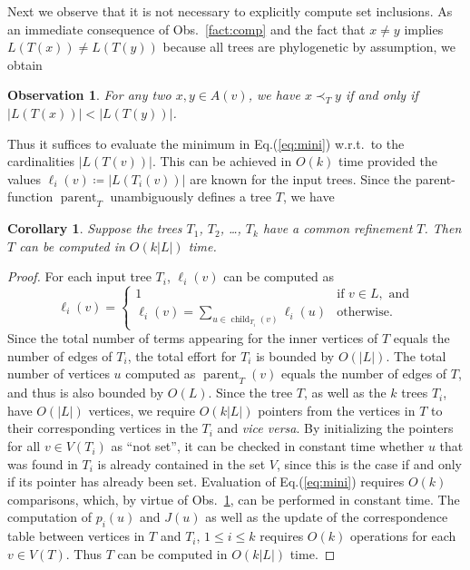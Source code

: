 \documentclass[11pt]{article}
\newtheorem{corollary}[theorem]{Corollary}
\newtheorem{fact}[theorem]{Observation}
\newcommand{\parent}{\operatorname{parent}}
\newcommand{\child}{\operatorname{child}}
\begin{document}
Next we observe that it is not necessary to explicitly compute set
inclusions. As an immediate consequence of Obs.~\ref{fact:comp} and the
fact that $x\ne y$ implies $L(T(x))\ne L(T(y))$ because all trees are
phylogenetic by assumption, we obtain
\begin{fact}
  \label{fact:cardi}
  For any two $x,y\in A(v)$, we have $x\prec_T y$ if and only if
  $|L(T(x))|<|L(T(y))|$. 
\end{fact}
Thus it suffices to evaluate the minimum in Eq.(\ref{eq:mini}) w.r.t.\ to
the cardinalities $|L(T(v))|$. This can be achieved in $O(k)$ time provided
the values $\ell_i(v)\coloneqq |L(T_i(v))|$ are known for the input
trees. Since the parent-function $\parent_T$ unambiguously defines a tree
$T$, we have
\begin{corollary}
  Suppose the trees $T_1$, $T_2$, \dots, $T_k$ have a common refinement
  $T$. Then $T$ can be computed in $O(k|L|)$ time.
  \label{cor:linear-if-T-exists}
\end{corollary}
\begin{proof}
  For each input tree $T_i$, $\ell_i(v)$ can be computed as
  \begin{equation}
    \label{eq:ell-i}
    \ell_i(v)=
    \begin{cases}
      1              & \text{if } v\in L, \text{ and} \\
      \ell_i(v)=\displaystyle\sum_{u\in\child_{T_i}(v)}\ell_i(u) 
      & \text{otherwise.}
    \end{cases}
  \end{equation}
  Since the total number of terms appearing for the inner vertices of $T$
  equals the number of edges of $T_i$, the total effort for $T_i$ is
  bounded by $O(|L|)$. The total number of vertices $u$ computed as
  $\parent_{T}(v)$ equals the number of edges of $T$, and thus is also
  bounded by $O(L)$.  Since the tree $T$, as well as the $k$ trees $T_i$,
  have $O(|L|)$ vertices, we require $O(k|L|)$ pointers from the vertices
  in $T$ to their corresponding vertices in the $T_i$ and \textit{vice
    versa}.  By initializing the pointers for all $v\in V(T_i)$ as ``not
  set'', it can be checked in constant time whether $u$ that was found in
  $T_i$ is already contained in the set $V$, since this is the case if and
  only if its pointer has already been set.  Evaluation of
  Eq.(\ref{eq:mini}) requires $O(k)$ comparisons, which, by virtue of
  Obs.~\ref{fact:cardi}, can be performed in constant time. The computation
  of $p_i(u)$ and $J(u)$ as well as the update of the correspondence table
  between vertices in $T$ and $T_i$, $1\le i\le k$ requires $O(k)$
  operations for each $v\in V(T)$. Thus $T$ can be computed in $O(k|L|)$
  time.
\end{proof}
\end{document}
